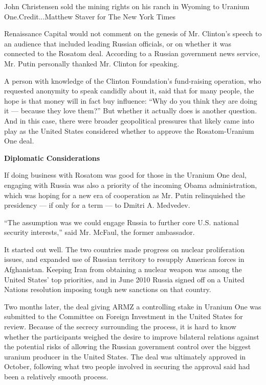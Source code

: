John Christensen sold the mining rights on his ranch in Wyoming to
Uranium One.Credit...Matthew Staver for The New York Times

Renaissance Capital would not comment on the genesis of Mr. Clinton's
speech to an audience that included leading Russian officials, or on
whether it was connected to the Rosatom deal. According to a Russian
government news service, Mr. Putin personally thanked Mr. Clinton for
speaking.

A person with knowledge of the Clinton Foundation's fund-raising
operation, who requested anonymity to speak candidly about it, said that
for many people, the hope is that money will in fact buy influence:
``Why do you think they are doing it --- because they love them?'' But
whether it actually does is another question. And in this case, there
were broader geopolitical pressures that likely came into play as the
United States considered whether to approve the Rosatom-Uranium One
deal.

\textbf{Diplomatic Considerations}

If doing business with Rosatom was good for those in the Uranium One
deal, engaging with Russia was also a priority of the incoming Obama
administration, which was hoping for a new era of cooperation as Mr.
Putin relinquished the presidency --- if only for a term --- to Dmitri
A. Medvedev.

``The assumption was we could engage Russia to further core U.S.
national security interests,'' said Mr. McFaul, the former ambassador.

It started out well. The two countries made progress on nuclear
proliferation issues, and expanded use of Russian territory to resupply
American forces in Afghanistan. Keeping Iran from obtaining a nuclear
weapon was among the United States' top priorities, and in June 2010
Russia signed off on a United Nations resolution imposing tough new
sanctions on that country.

Two months later, the deal giving ARMZ a controlling stake in Uranium
One was submitted to the Committee on Foreign Investment in the United
States for review. Because of the secrecy surrounding the process, it is
hard to know whether the participants weighed the desire to improve
bilateral relations against the potential risks of allowing the Russian
government control over the biggest uranium producer in the United
States. The deal was ultimately approved in October, following what two
people involved in securing the approval said had been a relatively
smooth process.


